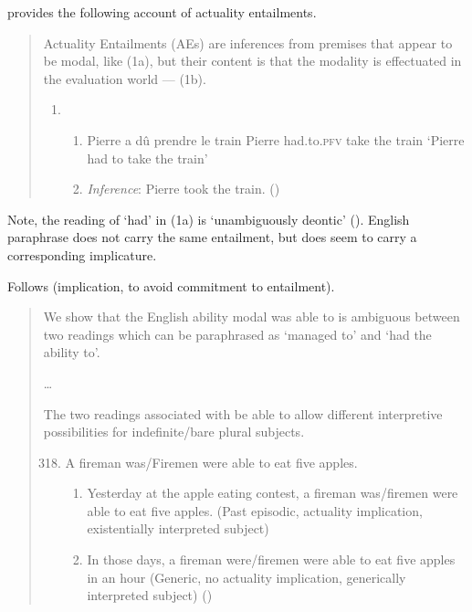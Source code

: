 \begin{note}[Entailment]
  \textcite{Alxatib:2019wf} provides the following account of actuality entailments.
  \begin{quote}
    Actuality Entailments (AEs) are inferences from premises that appear to be modal, like (1a), but their content is that the modality is effectuated in the evaluation world --- (1b).

    \begin{enumerate}[label=(\arabic*)]
    \item
      \begin{enumerate}[label=\alph*.]
      \item Pierre a dû \hspace{26pt} prendre le \hspace{3.5pt} train \newline
        Pierre had.to.\textsc{pfv} take \hspace{14pt} the train\newline
        \hspace{-4pt} ‘Pierre had to take the train'
      \item \emph{Inference}: Pierre took the train.\nolinebreak
    \mbox{}\hfill\mbox{(\citeyear[701]{Alxatib:2019wf})}
      \end{enumerate}
    \end{enumerate}
  \end{quote}

  Note, the reading of `had' in (1a) is `unambiguously deontic' (\citeyear[703]{Alxatib:2019wf}).
  English paraphrase does not carry the same entailment, but does seem to carry a corresponding implicature.

  Follows \textcite{Bhatt:1999wq} (implication, to avoid commitment to entailment).

  \begin{quote}
    We show that the English ability modal was able to is ambiguous between two readings which can be paraphrased as `managed to' and `had the ability to'.

    \dots

    The two readings associated with be able to allow different interpretive possibilities for indefinite/bare plural subjects.

    \begin{enumerate}[label=(\arabic*), ref=(\arabic*)]
      \setcounter{enumi}{317}
    \item A fireman was/Firemen were able to eat five apples.
      \begin{enumerate}[label=\alph*., ref=\alph*.]
      \item Yesterday at the apple eating contest, a fireman was/firemen were able to eat five apples. (Past episodic, actuality implication, existentially interpreted subject)
      \item In those days, a fireman were/firemen were able to eat five apples in an hour (Generic, no actuality implication, generically interpreted subject)\nolinebreak
        \mbox{}\hfill\mbox{(\citeauthor[172--173]{Bhatt:1999wq})}
      \end{enumerate}
    \end{enumerate}
  \end{quote}


\end{note}
